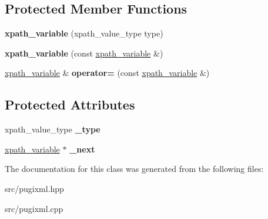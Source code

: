\subsection*{Protected Member Functions}
\begin{DoxyCompactItemize}
\item 
\mbox{\label{classpugi_1_1xpath__variable_a209a8e2cf18a2fa4e37faddaa216dda2}} 
{\bfseries xpath\+\_\+variable} (xpath\+\_\+value\+\_\+type type)
\item 
\mbox{\label{classpugi_1_1xpath__variable_a2d805ed204c1fec482f859217d1baa4a}} 
{\bfseries xpath\+\_\+variable} (const \hyperlink{classpugi_1_1xpath__variable}{xpath\+\_\+variable} \&)
\item 
\mbox{\label{classpugi_1_1xpath__variable_a0cd0e1223e99c0baf46488cfd2079961}} 
\hyperlink{classpugi_1_1xpath__variable}{xpath\+\_\+variable} \& {\bfseries operator=} (const \hyperlink{classpugi_1_1xpath__variable}{xpath\+\_\+variable} \&)
\end{DoxyCompactItemize}
\subsection*{Protected Attributes}
\begin{DoxyCompactItemize}
\item 
\mbox{\label{classpugi_1_1xpath__variable_aefb30100ab8bf3cf2ba623dd6ffbbd35}} 
xpath\+\_\+value\+\_\+type {\bfseries \+\_\+type}
\item 
\mbox{\label{classpugi_1_1xpath__variable_a0979cb72473e77a1b6d213046abfc46e}} 
\hyperlink{classpugi_1_1xpath__variable}{xpath\+\_\+variable} $\ast$ {\bfseries \+\_\+next}
\end{DoxyCompactItemize}


The documentation for this class was generated from the following files\+:\begin{DoxyCompactItemize}
\item 
src/pugixml.\+hpp\item 
src/pugixml.\+cpp\end{DoxyCompactItemize}
